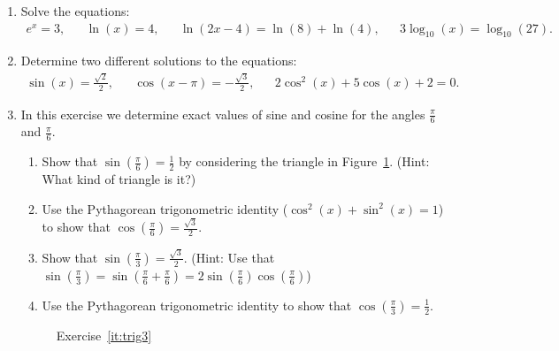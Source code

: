 \begin{enumerate}
	
	\item Solve the equations:
	\begin{align*}
	e^x=3,&& \ln(x)=4,&& \ln(2x-4)=\ln(8)+\ln(4),&& 3\log_{10}(x)=\log_{10}(27).
	\end{align*}
	

	\item Determine two different solutions to the equations:
	\begin{align*}
	\sin(x)=\frac{\sqrt{2}}{2},&& \cos(x-\pi)=-\frac{\sqrt{3}}{2},&& 2\cos^2(x)+5\cos(x)+2=0.
	\end{align*}

\item \label{it:trig3} In this exercise we determine exact values of sine and cosine for the angles $ \frac{\pi}{6}$ and $ \frac{\pi}{6} $.

\begin{enumerate}
	\item Show that $\sin(\frac{\pi}{6})=\frac{1}{2}$ by considering the triangle in Figure~\ref{fig:trig3}. (Hint: What kind of triangle is it?)
	
	\item Use the Pythagorean trigonometric identity ($ \cos^2(x)+\sin^2(x)=1 $) to show that $\cos(\frac{\pi}{6})=\frac{\sqrt{3}}{2}$.
	
	\item Show that $\sin(\frac{\pi}{3})=\frac{\sqrt{3}}{2}$. (Hint: Use that $ \sin(\frac{\pi}{3})=\sin(\frac{\pi}{6}+\frac{\pi}{6})=2\sin(\frac{\pi}{6})\cos(\frac{\pi}{6}) $)
	
	\item Use the Pythagorean trigonometric identity to show that $\cos(\frac{\pi}{3})=\frac{1}{2}$.
	
\end{enumerate}

\begin{figure}
	\centering
	\caption{Exercise~\ref{it:trig3}}
	\label{fig:trig3}
\end{figure}


\end{enumerate}
